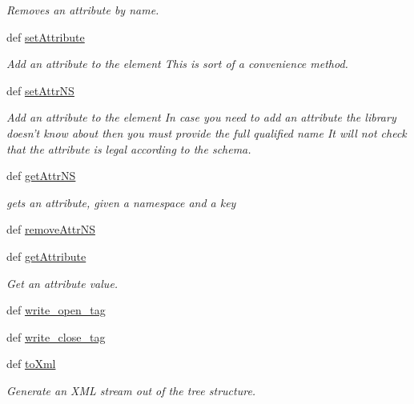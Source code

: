 \begin{DoxyCompactItemize}
\begin{DoxyCompactList}\small\item\em Removes an attribute by name. \end{DoxyCompactList}\item 
def \hyperlink{classodf_1_1element_1_1Element_acdbef59f5caf5bbb1afcc46d4c01baf9}{set\+Attribute}
\begin{DoxyCompactList}\small\item\em Add an attribute to the element This is sort of a convenience method. \end{DoxyCompactList}\item 
def \hyperlink{classodf_1_1element_1_1Element_a9263c523586b6e43cb44265281a54423}{set\+Attr\+N\+S}
\begin{DoxyCompactList}\small\item\em Add an attribute to the element In case you need to add an attribute the library doesn't know about then you must provide the full qualified name It will not check that the attribute is legal according to the schema. \end{DoxyCompactList}\item 
def \hyperlink{classodf_1_1element_1_1Element_a6c6bad8ddb25a3eb53946943461f5d12}{get\+Attr\+N\+S}
\begin{DoxyCompactList}\small\item\em gets an attribute, given a namespace and a key \end{DoxyCompactList}\item 
def \hyperlink{classodf_1_1element_1_1Element_a32e1e56f26c61b4f65cdf6a7fdbc0a63}{remove\+Attr\+N\+S}
\item 
def \hyperlink{classodf_1_1element_1_1Element_abc4db1dc9e2f6712bc4fc2fa358cf8dc}{get\+Attribute}
\begin{DoxyCompactList}\small\item\em Get an attribute value. \end{DoxyCompactList}\item 
def \hyperlink{classodf_1_1element_1_1Element_a51ddef230911fa83d62d6f3a0b08c592}{write\+\_\+open\+\_\+tag}
\item 
def \hyperlink{classodf_1_1element_1_1Element_a5e2c55304d35824924e035c50f505e08}{write\+\_\+close\+\_\+tag}
\item 
def \hyperlink{classodf_1_1element_1_1Element_aa278538d7c0568e820f11dcfeccc3975}{to\+Xml}
\begin{DoxyCompactList}\small\item\em Generate an X\+M\+L stream out of the tree structure. \end{DoxyCompactList}\item 

\end{DoxyCompactItemize}
